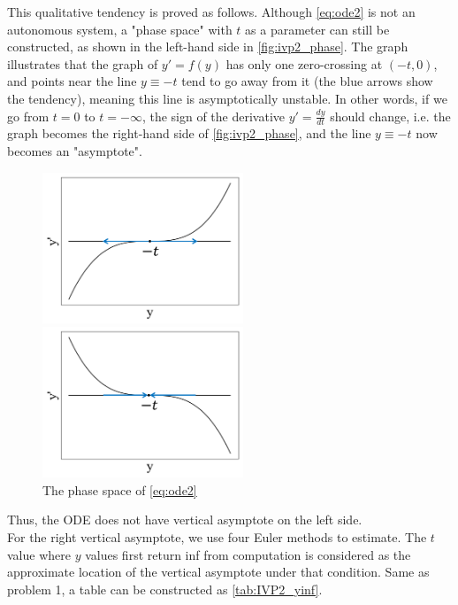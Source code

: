 \documentclass[a4paper]{article}
\begin{document}
	This qualitative tendency is proved as follows. Although \autoref{eq:ode2} is not an autonomous system, a "phase space" with $t$ as a parameter can still be constructed, as shown in the left-hand side in \autoref{fig:ivp2_phase}. The graph illustrates that the graph of $y' = f(y)$ has only one zero-crossing at $(-t, 0)$, and points near the line $y \equiv -t$ tend to go away from it (the blue arrows show the tendency), meaning this line is asymptotically unstable. In other words, if we go from $t = 0$ to $t = -\infty$, the sign of the derivative $y' = \frac{dy}{dt}$ should change, i.e. the graph becomes the right-hand side of \autoref{fig:ivp2_phase}, and the line $y \equiv -t$ now becomes an "asymptote".
	
	\begin{figure}[H]
		\subfigure 
		{
			\begin{minipage}{9cm}
				\centering      
				\includegraphics[width=6cm]{img/ivp2_phase_graph_1.png}
			\end{minipage}
		}
		\subfigure 
		{
			\begin{minipage}{7cm}
				\centering      
				\includegraphics[width=6cm]{img/ivp2_phase_graph_2.png}
			\end{minipage}
		}
		\caption{\label{fig:ivp2_phase} The phase space of \autoref{eq:ode2}} 
	\end{figure}
	
	Thus, the ODE does not have vertical asymptote on the left side. \\
	
	For the right vertical asymptote, we use four Euler methods to estimate. The $t$ value where $y$ values first return inf from computation is considered as the approximate location of the vertical asymptote under that condition. Same as problem 1, a table can be constructed as \autoref{tab:IVP2_yinf}.
	
\end{document}
